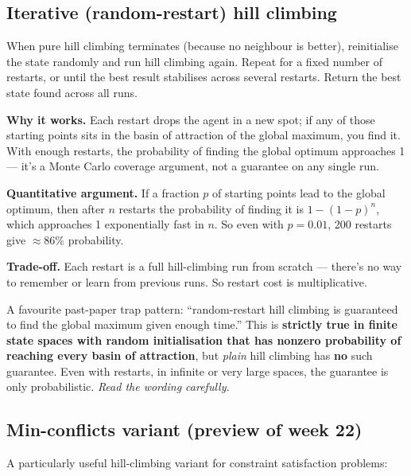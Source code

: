 \documentclass[11pt, a4paper]{article}
\begin{document}
\subsection{Iterative (random-restart) hill climbing}

\begin{defbox}
When pure hill climbing terminates (because no neighbour is better), reinitialise the state randomly and run hill climbing again. Repeat for a fixed number of restarts, or until the best result stabilises across several restarts. Return the best state found across all runs.
\end{defbox}

\textbf{Why it works.} Each restart drops the agent in a new spot; if any of those starting points sits in the basin of attraction of the global maximum, you find it. With enough restarts, the probability of finding the global optimum approaches 1 — it's a Monte Carlo coverage argument, not a guarantee on any single run.

\textbf{Quantitative argument.} If a fraction $p$ of starting points lead to the global optimum, then after $n$ restarts the probability of finding it is $1 - (1-p)^n$, which approaches 1 exponentially fast in $n$. So even with $p = 0.01$, 200 restarts give $\approx 86\%$ probability.

\textbf{Trade-off.} Each restart is a full hill-climbing run from scratch — there's no way to remember or learn from previous runs. So restart cost is multiplicative.

\begin{trapbox}
A favourite past-paper trap pattern: ``random-restart hill climbing is guaranteed to find the global maximum given enough time.'' This is \textbf{strictly true in finite state spaces with random initialisation that has nonzero probability of reaching every basin of attraction}, but \emph{plain} hill climbing has \textbf{no} such guarantee. Even with restarts, in infinite or very large spaces, the guarantee is only probabilistic. \emph{Read the wording carefully.}
\end{trapbox}

\subsection{Min-conflicts variant (preview of week 22)}

A particularly useful hill-climbing variant for constraint satisfaction problems:
\end{document}

